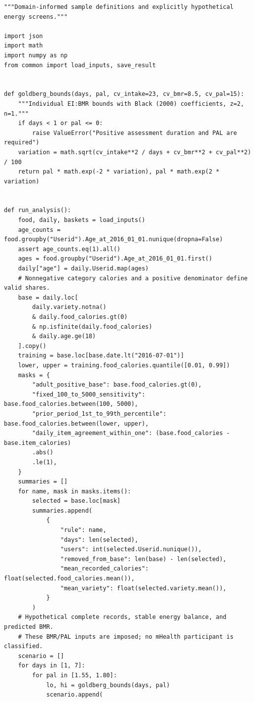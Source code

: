 \begin{Verbatim}[breaklines,breakanywhere,fontsize=\small]
"""Domain-informed sample definitions and explicitly hypothetical energy screens."""

import json
import math
import numpy as np
from common import load_inputs, save_result


def goldberg_bounds(days, pal, cv_intake=23, cv_bmr=8.5, cv_pal=15):
    """Individual EI:BMR bounds with Black (2000) coefficients, z=2, n=1."""
    if days < 1 or pal <= 0:
        raise ValueError("Positive assessment duration and PAL are required")
    variation = math.sqrt(cv_intake**2 / days + cv_bmr**2 + cv_pal**2) / 100
    return pal * math.exp(-2 * variation), pal * math.exp(2 * variation)


def run_analysis():
    food, daily, baskets = load_inputs()
    age_counts = food.groupby("Userid").Age_at_2016_01_01.nunique(dropna=False)
    assert age_counts.eq(1).all()
    ages = food.groupby("Userid").Age_at_2016_01_01.first()
    daily["age"] = daily.Userid.map(ages)
    # Nonnegative category calories and a positive denominator define valid shares.
    base = daily.loc[
        daily.variety.notna()
        & daily.food_calories.gt(0)
        & np.isfinite(daily.food_calories)
        & daily.age.ge(18)
    ].copy()
    training = base.loc[base.date.lt("2016-07-01")]
    lower, upper = training.food_calories.quantile([0.01, 0.99])
    masks = {
        "adult_positive_base": base.food_calories.gt(0),
        "fixed_100_to_5000_sensitivity": base.food_calories.between(100, 5000),
        "prior_period_1st_to_99th_percentile": base.food_calories.between(lower, upper),
        "daily_item_agreement_within_one": (base.food_calories - base.item_calories)
        .abs()
        .le(1),
    }
    summaries = []
    for name, mask in masks.items():
        selected = base.loc[mask]
        summaries.append(
            {
                "rule": name,
                "days": len(selected),
                "users": int(selected.Userid.nunique()),
                "removed_from_base": len(base) - len(selected),
                "mean_recorded_calories": float(selected.food_calories.mean()),
                "mean_variety": float(selected.variety.mean()),
            }
        )
    # Hypothetical complete records, stable energy balance, and predicted BMR.
    # These BMR/PAL inputs are imposed; no mHealth participant is classified.
    scenario = []
    for days in [1, 7]:
        for pal in [1.55, 1.80]:
            lo, hi = goldberg_bounds(days, pal)
            scenario.append(

\end{Verbatim}
